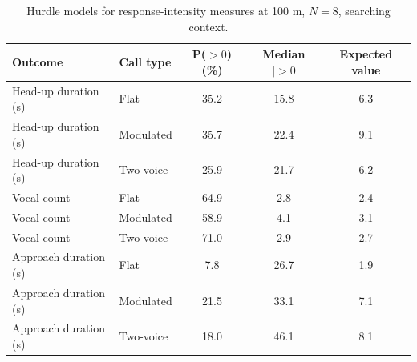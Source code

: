 \begin{table}[H]
\centering
\caption{Hurdle models for response-intensity measures at 100 m, $N=8$, searching context.}
\label{tab:p3int}
\small
\begin{tabular}{llccc}
\toprule
Outcome & Call type & P($>0$) (\%) & Median $|>0$ & Expected value \\
\midrule
Head-up duration (s) & Flat & 35.2 & 15.8 & 6.3 \\
Head-up duration (s) & Modulated & 35.7 & 22.4 & 9.1 \\
Head-up duration (s) & Two-voice & 25.9 & 21.7 & 6.2 \\
Vocal count & Flat & 64.9 & 2.8 & 2.4 \\
Vocal count & Modulated & 58.9 & 4.1 & 3.1 \\
Vocal count & Two-voice & 71.0 & 2.9 & 2.7 \\
Approach duration (s) & Flat & 7.8 & 26.7 & 1.9 \\
Approach duration (s) & Modulated & 21.5 & 33.1 & 7.1 \\
Approach duration (s) & Two-voice & 18.0 & 46.1 & 8.1 \\
\bottomrule
\end{tabular}
\end{table}